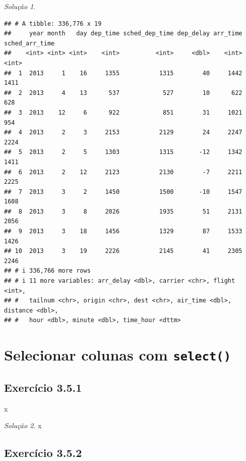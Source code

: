 \documentclass[
]{latex/krantz}
\theoremstyle{definition}
\theoremstyle{definition}
\theoremstyle{definition}
\theoremstyle{definition}
\theoremstyle{remark}
\newtheorem*{solution}{Solução}
\begin{document}
\begin{solution}
\begin{verbatim}
## # A tibble: 336,776 x 19
##     year month   day dep_time sched_dep_time dep_delay arr_time sched_arr_time
##    <int> <int> <int>    <int>          <int>     <dbl>    <int>          <int>
##  1  2013     1    16     1355           1315        40     1442           1411
##  2  2013     4    13      537            527        10      622            628
##  3  2013    12     6      922            851        31     1021            954
##  4  2013     2     3     2153           2129        24     2247           2224
##  5  2013     2     5     1303           1315       -12     1342           1411
##  6  2013     2    12     2123           2130        -7     2211           2225
##  7  2013     3     2     1450           1500       -10     1547           1608
##  8  2013     3     8     2026           1935        51     2131           2056
##  9  2013     3    18     1456           1329        87     1533           1426
## 10  2013     3    19     2226           2145        41     2305           2246
## # i 336,766 more rows
## # i 11 more variables: arr_delay <dbl>, carrier <chr>, flight <int>,
## #   tailnum <chr>, origin <chr>, dest <chr>, air_time <dbl>, distance <dbl>,
## #   hour <dbl>, minute <dbl>, time_hour <dttm>
\end{verbatim}

\end{solution}

\hypertarget{selecionar-colunas-com-select}{%
\section{\texorpdfstring{Selecionar colunas com \texttt{select()}}{Selecionar colunas com select()}}\label{selecionar-colunas-com-select}}

\hypertarget{exr3-5-1}{%
\subsection*{Exercício 3.5.1}\label{exr3-5-1}}

x

\begin{solution}
x
\end{solution}

\hypertarget{exr3-5-2}{%
\subsection*{Exercício 3.5.2}\label{exr3-5-2}}
\end{document}
